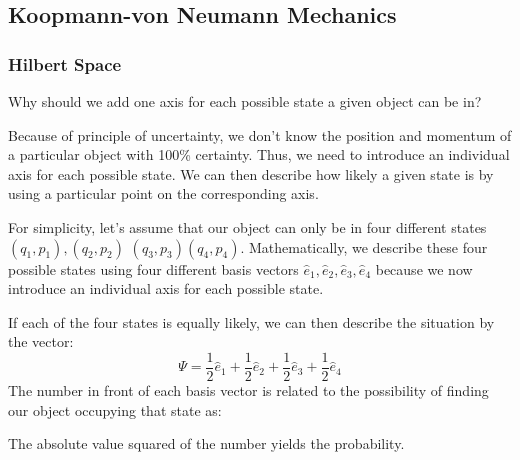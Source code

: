 \subsection{Koopmann-von Neumann Mechanics}
\subsubsection{Hilbert Space}
\begin{mybox}
\begin{center}
    Why should we add one axis for each possible state a given object can be in?
\end{center}
\end{mybox}
\begin{mybox2}
Because of principle of uncertainty, we don't know the position and momentum of a particular object with 100\% certainty. Thus, we need to introduce an individual axis for each possible state. We can then describe how likely a given state is by using a particular point on the corresponding axis.
\end{mybox2}
For simplicity, let's assume that our object can only be in four different states $\left(q_{1},p_{1}\right),\left(q_{2},p_{2}\right)$
$\left(q_{3}, p_{3}\right)\left(q_{4}, p_{4}\right)$. Mathematically, we describe these four possible states using four different basis vectors $\hat{e}_{1}, \hat{e}_{2}, \hat{e}_{3}, \hat{e}_{4}$ because we now introduce an individual axis for each possible state.

If each of the four states is equally likely, we can then describe the situation by the vector:
$$
\Psi=\frac{1}{2} \hat{e}_{1}+\frac{1}{2} \hat{e}_{2}+\frac{1}{2} \hat{e}_{3}+\frac{1}{2} \hat{e}_{4}
$$
The number in front of each basis vector is related to the possibility of finding our object occupying that state as:
\begin{qt}
\begin{center}
    The absolute value squared of the number yields the probability.
\end{center}
\end{qt}
